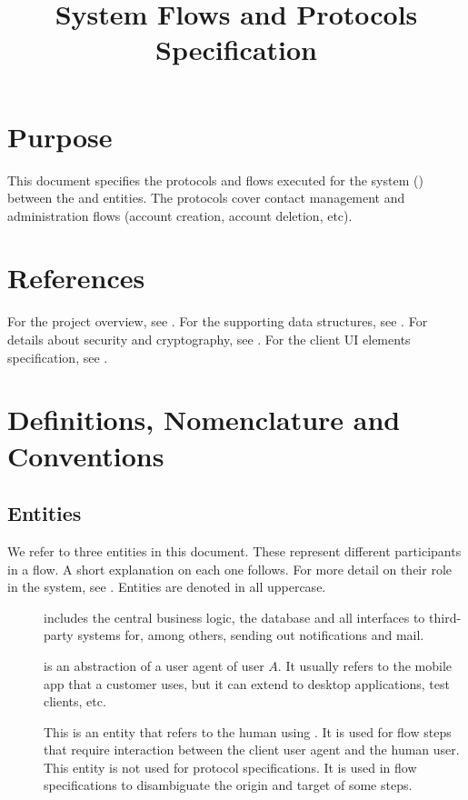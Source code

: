 \documentclass[a4paper,10pt]{article}
\title{\longProduct{} System Flows and Protocols Specification}
\begin{document}
\maketitle
\tableofcontents

\section{Purpose}
This document specifies the protocols and flows executed for the \longProduct{} system (\shortProduct{}) between the \server{} and \client{} entities. The protocols cover contact 
management and administration flows (account creation, account deletion, etc).

\section{References}
For the project overview, see \cite{project_spec}. For the supporting data structures, see \cite{data_structure_spec}. For details about security and cryptography, 
see \cite{crypto_spec}. For the client UI elements specification, see \cite{UI_spec}.

\section{Definitions, Nomenclature and Conventions}

\subsection{Entities}
We refer to three entities in this document. These represent different participants in a flow. A short explanation on each one follows. For more detail on their role in the 
system, see \cite{project_spec}. Entities are denoted in all uppercase.

\begin{description}
 \item[\Server{}] includes the central business logic, the database and all interfaces to third-party systems for, among others, sending out notifications and mail.
 \item[] is an abstraction of a user agent of user $A$. It usually refers to the mobile app that a customer uses, but it can extend to desktop applications, test clients, etc.
 \item[] This is an entity that refers to the human using . It is used for flow steps that require interaction between the client user agent and the human user. 
This entity is not used for protocol specifications. It is used in flow specifications to disambiguate the origin and target of some steps.
\end{description}
\end{document}
